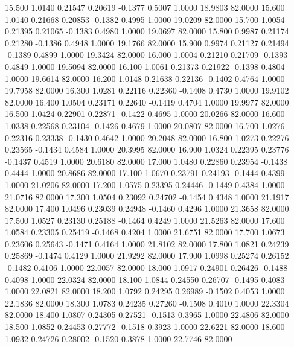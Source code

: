   15.500   1.0140   0.21547   0.20619  -0.1377   0.5007   1.0000  18.9803  82.0000
  15.600   1.0140   0.21668   0.20853  -0.1382   0.4995   1.0000  19.0209  82.0000
  15.700   1.0054   0.21395   0.21065  -0.1383   0.4980   1.0000  19.0697  82.0000
  15.800   0.9987   0.21174   0.21280  -0.1386   0.4948   1.0000  19.1766  82.0000
  15.900   0.9974   0.21127   0.21494  -0.1389   0.4899   1.0000  19.3424  82.0000
  16.000   1.0004   0.21210   0.21709  -0.1393   0.4849   1.0000  19.5094  82.0000
  16.100   1.0061   0.21373   0.21922  -0.1398   0.4804   1.0000  19.6614  82.0000
  16.200   1.0148   0.21638   0.22136  -0.1402   0.4764   1.0000  19.7958  82.0000
  16.300   1.0281   0.22116   0.22360  -0.1408   0.4730   1.0000  19.9102  82.0000
  16.400   1.0504   0.23171   0.22640  -0.1419   0.4704   1.0000  19.9977  82.0000
  16.500   1.0424   0.22901   0.22871  -0.1422   0.4695   1.0000  20.0266  82.0000
  16.600   1.0338   0.22568   0.23104  -0.1426   0.4679   1.0000  20.0807  82.0000
  16.700   1.0276   0.22316   0.23338  -0.1430   0.4642   1.0000  20.2048  82.0000
  16.800   1.0273   0.22276   0.23565  -0.1434   0.4584   1.0000  20.3995  82.0000
  16.900   1.0324   0.22395   0.23776  -0.1437   0.4519   1.0000  20.6180  82.0000
  17.000   1.0480   0.22860   0.23954  -0.1438   0.4444   1.0000  20.8686  82.0000
  17.100   1.0670   0.23791   0.24193  -0.1444   0.4399   1.0000  21.0206  82.0000
  17.200   1.0575   0.23395   0.24446  -0.1449   0.4384   1.0000  21.0716  82.0000
  17.300   1.0504   0.23092   0.24702  -0.1454   0.4348   1.0000  21.1917  82.0000
  17.400   1.0496   0.23039   0.24948  -0.1460   0.4296   1.0000  21.3658  82.0000
  17.500   1.0527   0.23130   0.25188  -0.1464   0.4249   1.0000  21.5263  82.0000
  17.600   1.0584   0.23305   0.25419  -0.1468   0.4204   1.0000  21.6751  82.0000
  17.700   1.0673   0.23606   0.25643  -0.1471   0.4164   1.0000  21.8102  82.0000
  17.800   1.0821   0.24239   0.25869  -0.1474   0.4129   1.0000  21.9292  82.0000
  17.900   1.0998   0.25274   0.26152  -0.1482   0.4106   1.0000  22.0057  82.0000
  18.000   1.0917   0.24901   0.26426  -0.1488   0.4098   1.0000  22.0324  82.0000
  18.100   1.0844   0.24550   0.26707  -0.1495   0.4083   1.0000  22.0821  82.0000
  18.200   1.0792   0.24295   0.26989  -0.1502   0.4053   1.0000  22.1836  82.0000
  18.300   1.0783   0.24235   0.27260  -0.1508   0.4010   1.0000  22.3304  82.0000
  18.400   1.0807   0.24305   0.27521  -0.1513   0.3965   1.0000  22.4806  82.0000
  18.500   1.0852   0.24453   0.27772  -0.1518   0.3923   1.0000  22.6221  82.0000
  18.600   1.0932   0.24726   0.28002  -0.1520   0.3878   1.0000  22.7746  82.0000
